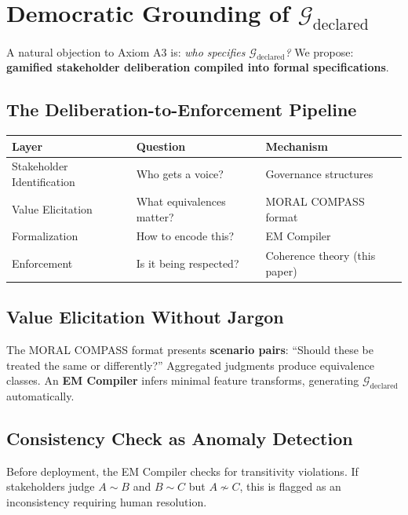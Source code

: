 \documentclass[12pt]{article}
\begin{document}
\section{Democratic Grounding of $\mathcal{G}_{\mathrm{declared}}$}

A natural objection to Axiom A3 is: \emph{who specifies $\mathcal{G}_{\mathrm{declared}}$?} We propose: \textbf{gamified stakeholder deliberation compiled into formal specifications}.

\subsection{The Deliberation-to-Enforcement Pipeline}

\begin{table}[ht]
\centering
\begin{tabular}{@{}lll@{}}
\toprule
\textbf{Layer} & \textbf{Question} & \textbf{Mechanism} \\
\midrule
Stakeholder Identification & Who gets a voice? & Governance structures \\
Value Elicitation & What equivalences matter? & MORAL COMPASS format \\
Formalization & How to encode this? & EM Compiler \\
Enforcement & Is it being respected? & Coherence theory (this paper) \\
\bottomrule
\end{tabular}
\end{table}

\subsection{Value Elicitation Without Jargon}

The MORAL COMPASS format presents \textbf{scenario pairs}: ``Should these be treated the same or differently?'' Aggregated judgments produce equivalence classes. An \textbf{EM Compiler} infers minimal feature transforms, generating $\mathcal{G}_{\mathrm{declared}}$ automatically.

\subsection{Consistency Check as Anomaly Detection}

Before deployment, the EM Compiler checks for transitivity violations. If stakeholders judge $A \sim B$ and $B \sim C$ but $A \not\sim C$, this is flagged as an inconsistency requiring human resolution.
\end{document}
